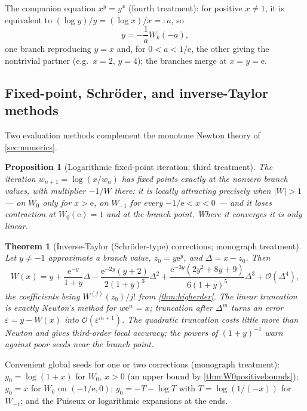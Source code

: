 \documentclass[11pt]{article}
\newtheorem{theorem}{Theorem}[section]
\newtheorem{proposition}[proposition]{Proposition}
\theoremstyle{remark}
\newcommand{\ee}{\mathrm e}
\newcommand{\bigO}{\mathcal O}
\newcommand{\abs}[1]{\left|#1\right|}
\begin{document}
The companion equation \(x^y=y^x\) (fourth treatment): for positive
\(x\ne1\), it is equivalent to \((\log y)/y=(\log x)/x=:a\), so
\begin{equation}\label{cmp:eq:xyyx}
 y=-\frac1aW_k(-a),
\end{equation}
one branch reproducing \(y=x\) and, for \(0<a<1/\ee\), the other giving the
nontrivial partner (e.g.\ \(x=2\), \(y=4\)); the branches merge at
\(x=y=\ee\).

\subsection{Fixed-point, Schr\"oder, and inverse-Taylor methods}

Two evaluation methods complement the monotone Newton theory of
\cref{sec:numerics}.

\begin{proposition}[Logarithmic fixed-point iteration; third treatment]
\label{cmp:prop:fixed-point}
The iteration \(w_{n+1}=\log(x/w_n)\) has fixed points exactly at the
nonzero branch values, with multiplier \(-1/W\) there: it is locally
attracting precisely when \(\abs W>1\) --- on \(W_0\) only for \(x>\ee\),
on \(W_{-1}\) for every \(-1/\ee<x<0\) --- and it loses contraction at
\(W_0(\ee)=1\) and at the branch point.  Where it converges it is only
linear.
\end{proposition}

\begin{theorem}[Inverse-Taylor (Schr\"oder-type) corrections; monograph
treatment]\label{cmp:thm:inverse-taylor}
Let \(y\ne-1\) approximate a branch value, \(z_0=y\ee^y\), and
\(\Delta=x-z_0\).  Then
\begin{equation}\label{cmp:eq:schroeder}
 W(x)=y+\frac{\ee^{-y}}{1+y}\Delta
 -\frac{\ee^{-2y}(y+2)}{2(1+y)^3}\Delta^2
 +\frac{\ee^{-3y}(2y^2+8y+9)}{6(1+y)^5}\Delta^3
 +\bigO(\Delta^4),
\end{equation}
the coefficients being \(W^{(j)}(z_0)/j!\) from
\cref{thm:higherder}.  The linear truncation is exactly Newton's method for
\(w\ee^w=x\); truncation after \(\Delta^m\) turns an error
\(\varepsilon=y-W(x)\) into \(\bigO(\varepsilon^{m+1})\).  The quadratic
truncation costs little more than Newton and gives third-order local
accuracy; the powers of \((1+y)^{-1}\) warn against poor seeds near the
branch point.
\end{theorem}

Convenient global seeds for one or two corrections (monograph treatment):
\(y_0=\log(1+x)\) for \(W_0\), \(x>0\) (an upper bound by
\cref{thm:W0positivebounds}); \(y_0=x\) for \(W_0\) on \((-1/\ee,0)\);
\(y_0=-T-\log T\) with \(T=\log(1/(-x))\) for \(W_{-1}\); and the Puiseux
or logarithmic expansions at the ends.
\end{document}
